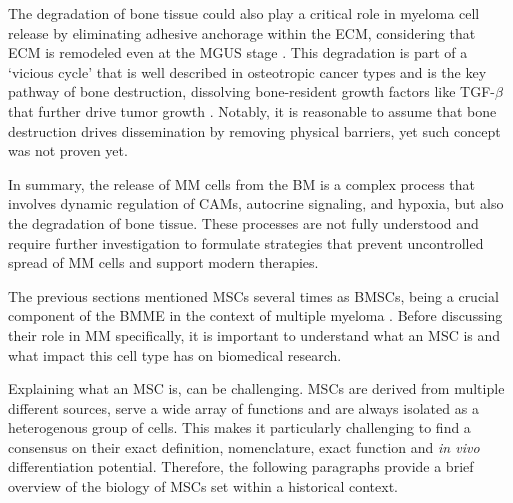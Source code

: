 The degradation of bone tissue could also play a critical role in myeloma cell
release by eliminating adhesive anchorage within the ECM, considering that
\ac{ECM} is remodeled even at the \ac{MGUS} stage
\citet{glaveyProteomicCharacterizationHuman2017}. This degradation is part of a
‘vicious cycle’ that is well described in osteotropic cancer types and is the
key pathway of bone destruction, dissolving bone-resident growth factors like
TGF-$\beta$ that further drive tumor growth
\cite{haradaMyelomaBoneInteraction2021, siclariMolecularInteractionsBreast2007,
    wangProstateCancerPromotes2019}. Notably, it is reasonable to assume that bone
destruction drives dissemination by removing physical barriers, yet such concept
was not proven yet.


In summary, the release of \ac{MM} cells from the \ac{BM} is a complex process
that involves dynamic regulation of \acp{CAM}, autocrine signaling, and hypoxia,
but also the degradation of bone tissue. These processes are not fully
understood and require further investigation to formulate strategies that
prevent uncontrolled spread of \ac{MM} cells and support modern therapies.








%
\label{sec:intro_hMSCs}%
The previous sections mentioned \acp{MSC} several times as \acp{BMSC}, being a
crucial component of the \ac{BMME} in the context of multiple myeloma
\cite{mangoliniBoneMarrowStromal2020}. Before discussing their role in \ac{MM}
specifically, it is important to understand what an \ac{MSC} is and what impact
this cell type has on biomedical research.

Explaining what an \ac{MSC} is, can be challenging. MSCs
are derived from multiple different sources, serve a wide array of functions and
are always isolated as a heterogenous group of cells. This makes it particularly
challenging to find a consensus on their exact definition, nomenclature, exact
function and \textit{in vivo} differentiation potential. Therefore, the
following paragraphs provide a brief overview of the biology of MSCs set within
a historical context.

